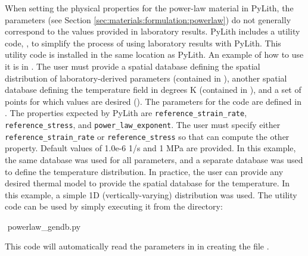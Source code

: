 When setting the physical properties for the power-law material in
PyLith, the parameters (see Section
\vref{sec:materials:formulation:powerlaw}) do not generally correspond
to the values provided in laboratory results.  PyLith includes a
utility code, , to simplify the process
of using laboratory results with PyLith. This utility code is
installed in the same location as PyLith. An example of how to use it
is in . The user must
provide a spatial database defining the spatial distribution of
laboratory-derived parameters (contained in
), another spatial database
defining the temperature field in degrees K (contained in
), and a set of points for which
values are desired ().  The parameters
for the code are defined in .  The
properties expected by PyLith are \texttt{reference\_strain\_rate},
\texttt{reference\_stress}, and \texttt{power\_law\_exponent}. The
user must specify either \texttt{reference\_strain\_rate} or
\texttt{reference\_stress} so that  can
compute the other property.  Default values of 1.0e-6 1/s and 1 MPa
are provided. In this example, the same database was used for all
parameters, and a separate database was used to define the temperature
distribution. In practice, the user can provide any desired thermal
model to provide the spatial database for the temperature. In this
example, a simple 1D (vertically-varying) distribution was used. The
utility code can be used by simply executing it from the
 directory:
\begin{shell}
$$ powerlaw_gendb.py
\end{shell}
This code will automatically read the parameters in 
in creating the file .

